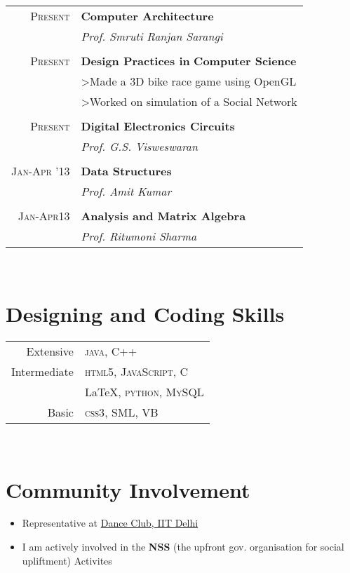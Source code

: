 \documentclass[10pt]{article} %
\begin{document}
{\begin{minipage}[t]{0.44\textwidth}
\begin{tabular}{rl}
 \textsc{Present} & \textbf{Computer Architecture}\\
& \textit{Prof. Smruti Ranjan Sarangi}\\\\
\textsc{Present} & \textbf{Design Practices in} \textbf{Computer Science}\\
&\footnotesize{>Made a 3D bike race game using OpenGL} \\ 
&\footnotesize{>Worked on simulation of a Social Network} \\ \\
 \textsc{Present} & \textbf{Digital Electronics Circuits}\\
& \textit{Prof. G.S. Visweswaran}\\\\
 \textsc{Jan-Apr '13} & \textbf{Data Structures}\\
& \textit{Prof. Amit Kumar}\\\\
\textsc{Jan-Apr13} & \textbf{Analysis and Matrix Algebra}\\
& \textit{Prof. Ritumoni Sharma}
\end{tabular}\\[10pt]


\section{Designing and Coding Skills} 

\begin{tabular}{rl}
Extensive
& \textsc{java}, C++\\[2pt]
Intermediate
& \textsc{html5}, \textsc{JavaScript, C}\\ & \LaTeX, \textsc{python, MySQL}\\[2pt]
Basic
& \textsc{css3}, \textsc{SML}, VB
\end{tabular}
\\

\section{Community Involvement}
\begin{itemize} \itemsep1pt 
\item Representative at \href{https://www.facebook.com/DanceClub.IITDelhi}{Dance Club, IIT Delhi}
\item I am actively involved in the \textbf{NSS} (the upfront gov. organisation for social upliftment) Activites
\end{itemize}


\end{minipage}}
\end{document}
